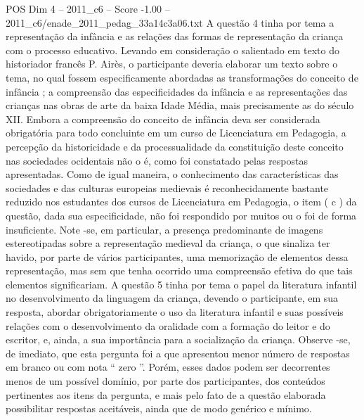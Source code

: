 \begin{textsample}{POS Dim 4 – 2011\_c6 – Score -1.00 – 2011\_c6/enade\_2011\_pedag\_33a14c3a06.txt}
A questão 4 tinha por tema a representação da infância e as relações das formas de representação da criança com o processo educativo.
Levando em consideração o salientado em texto do historiador francês P.
Airès, o participante deveria elaborar um texto sobre o tema, no qual fossem especificamente abordadas as transformações do conceito de infância ; a compreensão das especificidades da infância e as representações das crianças nas obras de arte da baixa Idade Média, mais precisamente as do século XII.
Embora a compreensão do conceito de infância deva ser considerada obrigatória para todo concluinte em um curso de Licenciatura em Pedagogia, a percepção da historicidade e da processualidade da constituição deste conceito nas sociedades ocidentais não o é, como foi constatado pelas respostas apresentadas.
Como de igual maneira, o conhecimento das características das sociedades e das culturas europeias medievais é reconhecidamente bastante reduzido nos estudantes dos cursos de Licenciatura em Pedagogia, o item ( c ) da questão, dada sua especificidade, não foi respondido por muitos ou o foi de forma insuficiente.
Note -se, em particular, a presença predominante de imagens estereotipadas sobre a representação medieval da criança, o que sinaliza ter havido, por parte de vários participantes, uma memorização de elementos dessa representação, mas sem que tenha ocorrido uma compreensão efetiva do que tais elementos significariam.
A questão 5 tinha por tema o papel da literatura infantil no desenvolvimento da linguagem da criança, devendo o participante, em sua resposta, abordar obrigatoriamente o uso da literatura infantil e suas possíveis relações com o desenvolvimento da oralidade com a formação do leitor e do escritor, e, ainda, a sua importância para a socialização da criança.
Observe -se, de imediato, que esta pergunta foi a que apresentou menor número de respostas em branco ou com nota “ zero ”.
Porém, esses dados podem ser decorrentes menos de um possível domínio, por parte dos participantes, dos conteúdos pertinentes aos itens da pergunta, e mais pelo fato de a questão elaborada possibilitar respostas aceitáveis, ainda que de modo genérico e mínimo.

\end{textsample}
